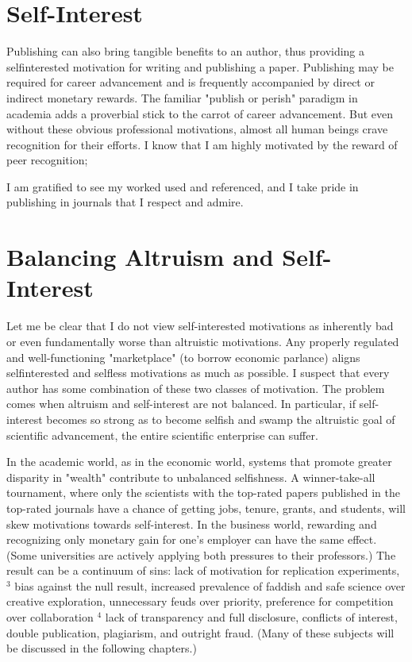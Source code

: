 \section*{Self-Interest}
Publishing can also bring tangible benefits to an author, thus providing a selfinterested motivation for writing and publishing a paper. Publishing may be required for career advancement and is frequently accompanied by direct or indirect monetary rewards. The familiar "publish or perish" paradigm in academia adds a proverbial stick to the carrot of career advancement. But even without these obvious professional motivations, almost all human beings crave recognition for their efforts. I know that I am highly motivated by the reward of peer recognition;

I am gratified to see my worked used and referenced, and I take pride in publishing in journals that I respect and admire.

\section*{Balancing Altruism and Self-Interest}
Let me be clear that I do not view self-interested motivations as inherently bad or even fundamentally worse than altruistic motivations. Any properly regulated and well-functioning "marketplace" (to borrow economic parlance) aligns selfinterested and selfless motivations as much as possible. I suspect that every author has some combination of these two classes of motivation. The problem comes when altruism and self-interest are not balanced. In particular, if self-interest becomes so strong as to become selfish and swamp the altruistic goal of scientific advancement, the entire scientific enterprise can suffer.

In the academic world, as in the economic world, systems that promote greater disparity in "wealth" contribute to unbalanced selfishness. A winner-take-all tournament, where only the scientists with the top-rated papers published in the top-rated journals have a chance of getting jobs, tenure, grants, and students, will skew motivations towards self-interest. In the business world, rewarding and recognizing only monetary gain for one's employer can have the same effect. (Some universities are actively applying both pressures to their professors.) The result can be a continuum of sins: lack of motivation for replication experiments, ${ }^{3}$ bias against the null result, increased prevalence of faddish and safe science over creative exploration, unnecessary feuds over priority, preference for competition over collaboration ${ }^{4}$ lack of transparency and full disclosure, conflicts of interest, double publication, plagiarism, and outright fraud. (Many of these subjects will be discussed in the following chapters.)

